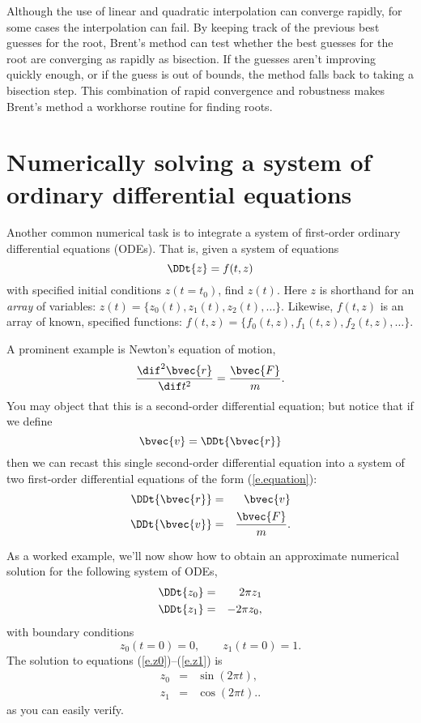 Although the use of linear and quadratic interpolation can converge rapidly, for some cases the interpolation can fail. By keeping track of the previous best guesses for the root, Brent's method can test whether the best guesses for the root are converging as rapidly as bisection. If the guesses aren't improving quickly enough, or if the guess is out of bounds, the method falls back to taking a bisection step. This combination of rapid convergence and robustness makes Brent's method a workhorse routine for finding roots.

\section[Solving a system of ordinary differential equations]{Numerically solving a system of ordinary differential equations}
Another common numerical task is to integrate a system of first-order ordinary differential equations (ODEs). That is, given a system of equations
\begin{equation}\label{e.equation}
\DDt{z} = f(t,z)
\end{equation}
with specified initial conditions $z(t=t_{0})$, find $z(t)$.
Here $z$ is shorthand for an \emph{array} of variables: $z(t) = \{ z_{0}(t), z_{1}(t), z_{2}(t), \ldots\}$. Likewise, $f(t,z)$ is an array of known, specified functions: $f(t,z) = \{f_{0}(t,z), f_{1}(t,z), f_{2}(t,z), \ldots\}$.

A prominent example is Newton's equation of motion,
\begin{equation}\label{e.Newton-2nd}
\frac{\dif^{2}\bvec{r}}{\dif t^{2}} = \frac{\bvec{F}}{m}.
\end{equation}
You may object that this is a second-order differential equation; but notice that if we define
\[
	\bvec{v} = \DDt{\bvec{r}}
\]
then we can recast this single second-order differential equation into a system of two first-order differential equations of the form (\ref{e.equation}):
\begin{eqnarray}
	\DDt{\bvec{r}} &=& \bvec{v}\\
	\DDt{\bvec{v}} &=& \frac{\bvec{F}}{m}.
\end{eqnarray}

As a worked example, we'll now show how to obtain an approximate numerical solution for the following system of ODEs,
\begin{eqnarray}
\DDt{z_{0}} &=&  2\pi z_{1}\label{e.z0}\\
\DDt{z_{1}} &=& -2\pi z_{0}\label{e.z1},
\end{eqnarray}
with boundary conditions
\begin{equation}\label{e.z-boundary}
	z_{0}(t=0) = 0,\qquad z_{1}(t=0) = 1.
\end{equation}
The solution to equations (\ref{e.z0})--(\ref{e.z1}) is
\begin{eqnarray}
z_{0} &=& \sin(2\pi t),\label{e.z0-sol}\\
z_{1} &=& \cos(2\pi t).\label{e.z1-sol}.
\end{eqnarray}
as you can easily verify.

